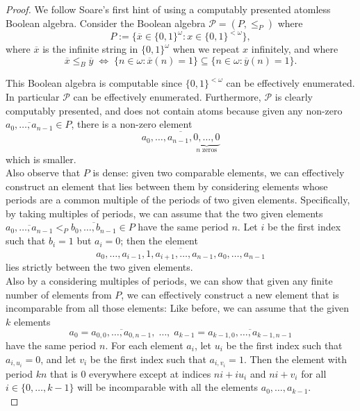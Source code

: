 \documentclass{article}
\begin{document}
  \begin{proof}
    We follow Soare's first hint of using a computably presented atomless
    Boolean algebra. Consider the Boolean algebra $\mathcal{P}=(P,\leq_P)$
    where
    \[P:= \{\overline{x}\in \{0,1\}^\omega: x\in \{0,1\}^{<\omega}\},\]
    where $\overline{x}$ is the infinite string in $\{0,1\}^\omega$ when we
    repeat $x$ infinitely, and where
    \[\overline{x} \leq_B\overline{y}\; \Leftrightarrow\; \{n\in\omega:
    \overline{x}(n)=1\} \subseteq \{n\in\omega: \overline{y}(n)=1\}.\]

    This Boolean algebra is computable since $\{0,1\}^{<\omega}$ can be
    effectively enumerated. In particular $\mathcal{P}$ can be effectively
    enumerated. Furthermore, $\mathcal{P}$ is clearly computably presented,
    and does not contain atoms because given any non-zero
    $\overline{a_0,\ldots,a_{n-1}}\in P$, there is a non-zero element
    \[\overline{a_0,\ldots,a_{n-1},\underbrace{0,\ldots,0}_{n\;
    \text{zeros}}}\]
    which is smaller. \\

    Also observe that $P$ is dense: given two comparable
    elements, we can effectively construct an element that lies between
    them by considering elements whose periods are a common multiple of the
    periods of two given elements. Specifically, by taking multiples of
    periods, we can assume that the two given elements
    $\overline{a_0,\ldots,a_{n-1}} <_P\overline{b_0,\ldots,b_{n-1}}\in P$
    have the same period $n$. Let $i$ be the first index such that $b_i=1$
    but $a_i=0$; then the element
    \[\overline{a_0,\ldots,a_{i-1},1,a_{i+1},\ldots,a_{n-1},
    a_0,\ldots,a_{n-1}}\]
    lies strictly between the two given elements. \\

    Also by a considering multiples of periods, we can show that given any
    finite number of elements from $P$, we can effectively construct a new
    element that is incomparable from all those elements: Like before, we
    can assume that the given $k$ elements
    \[a_0=\overline{a_{0,0},\ldots,a_{0,n-1}},\; \ldots,\;
    a_{k-1}=\overline{a_{k-1,0},\ldots,a_{k-1,n-1}}\]
    have the same period $n$. For each element $a_i$, let $u_i$ be the
    first index such that $a_{i,u_i}=0$, and let $v_i$ be the
    first index such that $a_{i,v_i}=1$. Then the element with period $kn$
    that is 0 everywhere except at indices $ni+iu_i$ and $ni+v_i$ for all
    $i\in\{0,\ldots,k-1\}$ will be incomparable with all the elements
    $a_0,\ldots,a_{k-1}$. \\


\end{proof}
\end{document}
